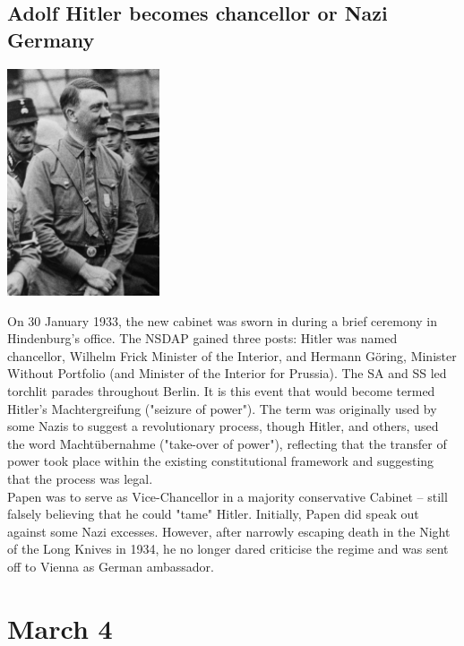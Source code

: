 \documentclass[11pt]{report}
\begin{document}
\subsection{Adolf Hitler becomes chancellor or Nazi Germany}
\vspace{2mm}\begin{center}\includegraphics[width=4.5cm]{./img/hitlerChancellor.jpg}\end{center}
On 30 January 1933, the new cabinet was sworn in during a brief ceremony in Hindenburg's office. The NSDAP gained three posts: Hitler was named chancellor, Wilhelm Frick Minister of the Interior, and Hermann Göring, Minister Without Portfolio (and Minister of the Interior for Prussia). The SA and SS led torchlit parades throughout Berlin. It is this event that would become termed Hitler's Machtergreifung ("seizure of power"). The term was originally used by some Nazis to suggest a revolutionary process, though Hitler, and others, used the word Machtübernahme ("take-over of power"), reflecting that the transfer of power took place within the existing constitutional framework and suggesting that the process was legal.\\ \indent Papen was to serve as Vice-Chancellor in a majority conservative Cabinet – still falsely believing that he could "tame" Hitler. Initially, Papen did speak out against some Nazi excesses. However, after narrowly escaping death in the Night of the Long Knives in 1934, he no longer dared criticise the regime and was sent off to Vienna as German ambassador.
\section{March 4}
\end{document}

